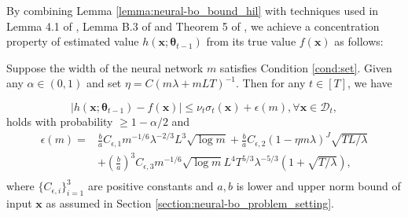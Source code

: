 \noindent By combining Lemma \ref{lemma:neural-bo_bound_hil} with techniques used in Lemma 4.1 of \citet{cao2019generalization}, Lemma B.3 
 of \citet{cao2019generalization} and Theorem 5 
of \citet{allen2019convergence}, we achieve a concentration property of estimated value $h(\mathbf{x}; \boldsymbol{\theta}_{t-1})$ from its true value $f(\mathbf{x})$ as follows:
\begin{lemma}
\label{lemma:neural-bo_predictive_bound}
Suppose the width of the neural network $m$ satisfies Condition \ref{cond:set}. Given any $\alpha \in (0,1)$ and set $\eta = C(m\lambda + mLT)^{-1}$.  Then for any $t \in [T]$, we have

\[\lvert h(\mathbf{x}; \boldsymbol{\theta}_{t-1}) - f(\mathbf{x}) \rvert \leq \nu_t \sigma_t(\mathbf{x}) + \epsilon(m), \forall \mathbf{x} \in \mathcal{D}_t, \] holds with probability $\geq  1-\alpha/2$ and 
\begin{equation*}
    \begin{split}
     \epsilon(m) = & \frac{b}{a} C_{\epsilon,1} m^{-1/6}\lambda^{-2/3}L^3 \sqrt{\log m} + \frac{b}{a} C_{\epsilon,2} (1-\eta m\lambda)^J \sqrt{TL/\lambda}\\
     & + \left(\frac{b}{a}\right)^3 C_{\epsilon,3} m^{-1/6} \sqrt{\log m} L^4 T^{5/3} \lambda^{-5/3} (1+\sqrt{T/\lambda}), \\
    \end{split}
\end{equation*}
where $\{C_{\epsilon,i}\}_{i=1}^3$ are positive constants and $a,b$ is lower and upper norm bound of input $\mathbf{x}$ as assumed in Section \ref{section:neural-bo_problem_setting}.
\end{lemma}
